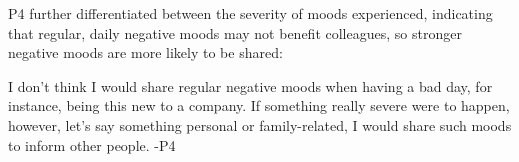 

P4 further differentiated between the severity of moods experienced, indicating that regular, daily negative moods may not benefit colleagues, so stronger negative moods are more likely to be shared:

\begin{displayquote}
    I don't think I would share regular negative moods when having a bad day, for instance, being this new to a company. If something really severe were to happen, however, let's say something personal or family-related, I would share such moods to inform other people. -P4
\end{displayquote}






